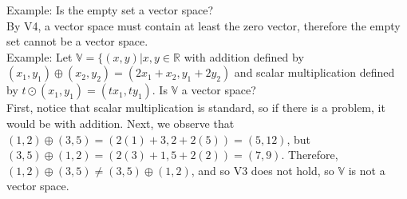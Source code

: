 \documentclass[10pt,letter]{article}
\begin{document}
Example: Is the empty set a vector space? \\ 
By V4, a vector space must contain at least the zero vector, therefore the empty set cannot be a vector space. \\ 
Example: Let $\mathbb{V}=\{(x,y)|x,y\in\mathbb{R}$ with addition defined by $(x_1,y_1)\oplus(x_2,y_2)=(2x_1+x_2,y_1+2y_2)$ and scalar multiplication defined by $t\odot(x_1,y_1)=(tx_1,ty_1)$. Is $\mathbb{V}$ a vector space? \\ 
First, notice that scalar multiplication is standard, so if there is a problem, it would be with addition. Next, we observe that $(1,2)\oplus (3,5)=(2(1)+3,2+2(5))=(5,12)$, but $(3,5)\oplus(1,2)=(2(3)+1,5+2(2))=(7,9)$. Therefore, $(1,2)\oplus(3,5)\neq(3,5)\oplus(1,2)$, and so V3 does not hold, so $\mathbb{V}$ is not a vector space. 
\end{document}
